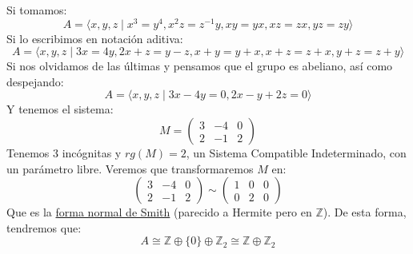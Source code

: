 \begin{ejemplo}
    Si tomamos:
    \begin{equation*}
        A = \langle x,y,z \mid x^3=y^4, x^2z = z^{-1}y, xy=yx, xz=zx, yz=zy \rangle 
    \end{equation*}
    Si lo escribimos en notación aditiva:
    \begin{equation*}
        A = \langle x,y,z \mid 3x=4y, 2x+z = y-z, x+y=y+x, x+z = z+x, y+z=z+y\rangle 
    \end{equation*}
    Si nos olvidamos de las últimas y pensamos que el grupo es abeliano, así como despejando:
    \begin{equation*}
        A = \langle x,y,z \mid 3x-4y = 0, 2x-y+2z = 0 \rangle 
    \end{equation*}
    Y tenemos el sistema:
    \begin{equation*}
        M = \left(\begin{array}{ccc}
            3 & -4 & 0 \\
            2 & -1 & 2
        \end{array}\right)
    \end{equation*}
    Tenemos 3 incógnitas y $rg(M) = 2$, un Sistema Compatible Indeterminado, con un parámetro libre. Veremos que transformaremos $M$ en:
    \begin{equation*}
        \left(\begin{array}{ccc}
            3 & -4 & 0 \\
            2 & -1 & 2
        \end{array}\right) \sim \left(\begin{array}{ccc}
            1 & 0 & 0 \\
            0 & 2 & 0
        \end{array}\right)
    \end{equation*}
    Que es la \underline{forma normal de Smith} (parecido a Hermite pero en $\mathbb{Z}$). De esta forma, tendremos que:
    \begin{equation*}
        A\cong \mathbb{Z} \oplus \{0\} \oplus \mathbb{Z}_2 \cong \mathbb{Z} \oplus \mathbb{Z}_2
    \end{equation*} %
\end{ejemplo}


